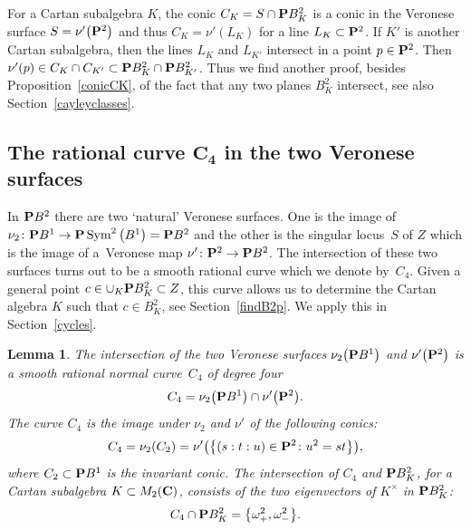 \documentclass[pdftex]{sigma}
\numberwithin{equation}{section}
\newtheorem{Lemma}[Theorem]{Lemma}
\begin{document}
\begin{Remark} \label{linesLK}
For a Cartan subalgebra $K$, the conic $C_K=S\cap {\bf P} B^2_K$
is a conic in the Veronese surface $S=\nu'\big({\bf P}^2\big)$
and thus $C_K=\nu'(L_K)$ for a line $L_K\subset {\bf P}^2$. If $K'$ is another Cartan subalgebra,
then the lines $L_K$ and $L_{K'}$ intersect in a point $p\in {\bf P}^2$. Then
$\nu'(p)\in C_K\cap C_{K'}\subset {\bf P} B^2_K\cap {\bf P} B^2_{K'}$. Thus we find another proof, besides
Proposition~\ref{conicCK}, of the fact that any two planes $B^2_K$ intersect,
see also Section~\ref{cayleyclasses}.
\end{Remark}

\subsection[The rational curve C\_4 in the two Veronese surfaces]{The rational curve $\boldsymbol{C_4}$ in the two Veronese surfaces}

In ${\bf P} B^2$ there are two `natural' Veronese surfaces.
One is the image of $\nu_2\colon {\bf P} B^1\rightarrow {\bf P} \operatorname{Sym}^2\big(B^1\big)\allowbreak ={\bf P} B^2$ and the other is
the singular locus~$S$ of $Z$ which is the image of a~Veronese map $\nu'\colon {\bf P}^2\allowbreak \rightarrow {\bf P} B^2$.
The intersection of these two surfaces turns out to be a smooth rational
curve which we denote by~$C_4$.
Given a general point $c\in \cup_K {\bf P} B^2_K\subset Z$, this curve allows us to determine
the Cartan algebra $K$ such that $c\in B^2_K$, see Section~\ref{findB2p}.
We apply this in Section~\ref{cycles}.

\begin{Lemma}\label{quarticc4}\label{C4B2p}
The intersection of the two Veronese surfaces $\nu_2\big({\bf P} B^1\big)$ and $\nu'\big({\bf P}^2\big)$
is a smooth rational normal curve~$C_4$ of degree four
\[
C_4 = \nu_2\big({\bf P} B^1\big) \cap \nu'\big({\bf P}^2\big).
\]
The curve $C_4$ is the image under $\nu_2$ and $\nu'$ of the following conics:
\[
C_4 = \nu_2(C_2) = \nu'\big(\big\{(s:t:u)\in{\bf P}^2\colon u^2=st \big\}\big),
\]
where $C_2\subset{\bf P} B^1$ is the invariant conic.
The intersection of $C_4$ and ${\bf P} B^2_K$, for a Cartan subalgebra $K\subset M_2({\bf C})$,
consists of the two eigenvectors of $K^\times$ in ${\bf P} B^2_K$:
\[
C_4 \cap {\bf P} B^2_K = \big\{\omega_+^2, \omega_-^2 \big\}.
\]
\end{Lemma}
\end{document}
